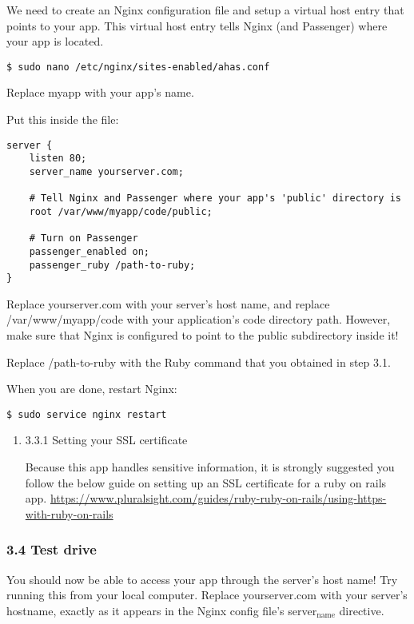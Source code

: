 \documentclass[11pt]{article}
\begin{document}
We need to create an Nginx configuration file and setup a virtual host entry that points to your app. This virtual host entry tells Nginx (and Passenger) where your app is located.
\begin{verbatim}
$ sudo nano /etc/nginx/sites-enabled/ahas.conf
\end{verbatim}
Replace myapp with your app's name.

Put this inside the file:
\begin{verbatim}
server {
    listen 80;
    server_name yourserver.com;

    # Tell Nginx and Passenger where your app's 'public' directory is
    root /var/www/myapp/code/public;

    # Turn on Passenger
    passenger_enabled on;
    passenger_ruby /path-to-ruby;
}
\end{verbatim}
Replace yourserver.com with your server's host name, and replace /var/www/myapp/code with your application's code directory path. However, make sure that Nginx is configured to point to the public subdirectory inside it!

Replace /path-to-ruby with the Ruby command that you obtained in step 3.1.

When you are done, restart Nginx:

\begin{verbatim}
$ sudo service nginx restart
\end{verbatim}

\begin{enumerate}
\item 3.3.1 Setting your SSL certificate
\label{sec:org1edf467}

Because this app handles sensitive information, it is strongly suggested you follow the below guide on setting up an SSL certificate for a ruby on rails app.
\url{https://www.pluralsight.com/guides/ruby-ruby-on-rails/using-https-with-ruby-on-rails}
\end{enumerate}

\subsubsection{3.4 Test drive}
\label{sec:org9bb107b}

You should now be able to access your app through the server's host name! Try running this from your local computer. Replace yourserver.com with your server's hostname, exactly as it appears in the Nginx config file's server\(_{\text{name}}\) directive.
\end{document}
